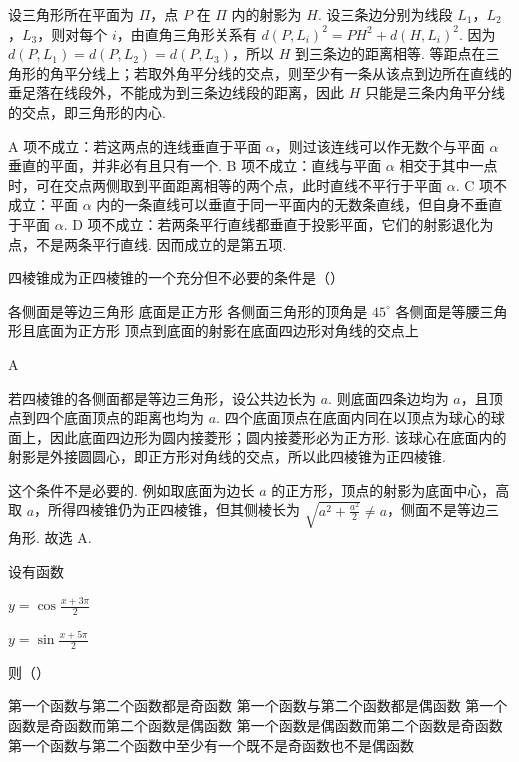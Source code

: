 \documentclass[UTF8,a4paper,oneside,11pt]{ctexbook}
\begin{document}
\begin{solution}
设三角形所在平面为 \(\Pi\)，点 \(P\) 在 \(\Pi\) 内的射影为 \(H\). 设三条边分别为线段 \(L_1\)，\(L_2\)，\(L_3\)，则对每个 \(i\)，由直角三角形关系有 \(d(P,L_i)^2=PH^2+d(H,L_i)^2\). 因为 \(d(P,L_1)=d(P,L_2)=d(P,L_3)\)，所以 \(H\) 到三条边的距离相等. 等距点在三角形的角平分线上；若取外角平分线的交点，则至少有一条从该点到边所在直线的垂足落在线段外，不能成为到三条边线段的距离，因此 \(H\) 只能是三条内角平分线的交点，即三角形的内心.

A 项不成立：若这两点的连线垂直于平面 \(\alpha\)，则过该连线可以作无数个与平面 \(\alpha\) 垂直的平面，并非必有且只有一个. B 项不成立：直线与平面 \(\alpha\) 相交于其中一点时，可在交点两侧取到平面距离相等的两个点，此时直线不平行于平面 \(\alpha\). C 项不成立：平面 \(\alpha\) 内的一条直线可以垂直于同一平面内的无数条直线，但自身不垂直于平面 \(\alpha\). D 项不成立：若两条平行直线都垂直于投影平面，它们的射影退化为点，不是两条平行直线. 因而成立的是第五项.
\end{solution}

\begin{problem}

四棱锥成为正四棱锥的一个充分但不必要的条件是（\quad）

\choicesfive
    {各侧面是等边三角形}
    {底面是正方形}
    {各侧面三角形的顶角是 \(45^{\circ} \)}
    {各侧面是等腰三角形且底面为正方形}
    {顶点到底面的射影在底面四边形对角线的交点上}
\end{problem}

\begin{answer}
A
\end{answer}

\begin{solution}
若四棱锥的各侧面都是等边三角形，设公共边长为 \(a\). 则底面四条边均为 \(a\)，且顶点到四个底面顶点的距离也均为 \(a\). 四个底面顶点在底面内同在以顶点为球心的球面上，因此底面四边形为圆内接菱形；圆内接菱形必为正方形. 该球心在底面内的射影是外接圆圆心，即正方形对角线的交点，所以此四棱锥为正四棱锥.

这个条件不是必要的. 例如取底面为边长 \(a\) 的正方形，顶点的射影为底面中心，高取 \(a\)，所得四棱锥仍为正四棱锥，但其侧棱长为 \(\sqrt{a^2+\frac{a^2}{2}}\ne a\)，侧面不是等边三角形. 故选 A.
\end{solution}

\begin{problem}

设有函数

\begin{circlelist}
\item \(y = \cos \frac{x + 3\pi}{2}\)
\item \(y = \sin \frac{x + 5\pi}{2}\)
\end{circlelist}

则（\quad）

\choicesfive
    {第一个函数与第二个函数都是奇函数}
    {第一个函数与第二个函数都是偶函数}
    {第一个函数是奇函数而第二个函数是偶函数}
    {第一个函数是偶函数而第二个函数是奇函数}
    {第一个函数与第二个函数中至少有一个既不是奇函数也不是偶函数}
\end{problem}
\end{document}

